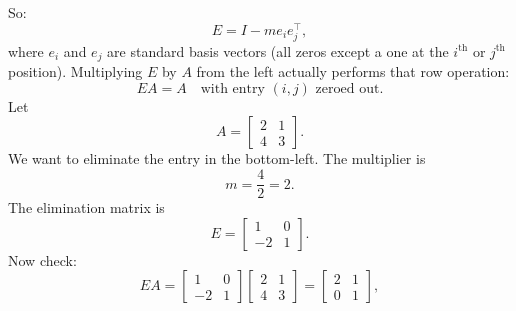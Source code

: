 \documentclass{report}
\begin{document}
\begin{itemize}
            So:
            \[
                E = I - m e_i e_j^{\top},
            \]
            where $e_i$ and $e_j$ are standard basis vectors (all zeros except a one at the $i^{\text{th}}$ or $j^{\text{th}} $ position).
            \bigbreak \noindent 
            Multiplying $E$ by $A$ from the left actually performs that row operation:
            \[
                EA = A \quad \text{with entry $(i,j)$ zeroed out.}
            \]
            Let
            \[
                A = \begin{bmatrix}
                    2 & 1 \\
                    4 & 3
                \end{bmatrix}.
            \]
            We want to eliminate the entry in the bottom-left.  
            \bigbreak \noindent 
            The multiplier is
            \[
                m = \frac{4}{2} = 2.
            \]
            The elimination matrix is
            \[
                E = \begin{bmatrix}
                    1 & 0 \\
                    -2 & 1
                \end{bmatrix}.
            \]
            Now check:
            \[
                EA =
                \begin{bmatrix}
                    1 & 0 \\
                    -2 & 1
                \end{bmatrix}
                \begin{bmatrix}
                    2 & 1 \\
                    4 & 3
                \end{bmatrix}
                =
                \begin{bmatrix}
                    2 & 1 \\
                    0 & 1
                \end{bmatrix},
            \]


\end{itemize}
\end{document}
